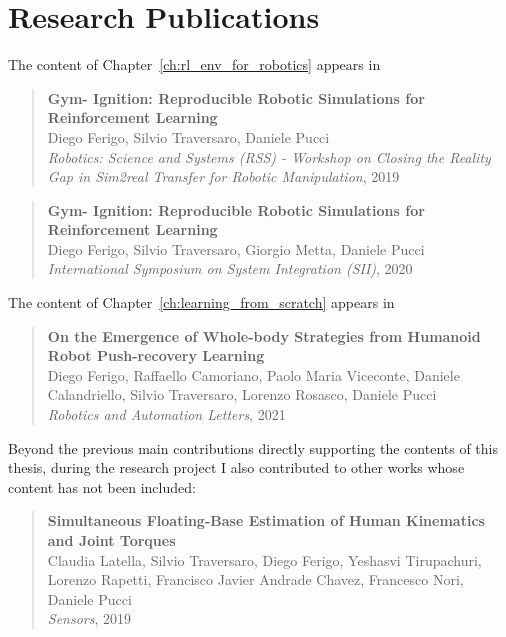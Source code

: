 \section*{Research Publications}

The content of Chapter~\ref{ch:rl_env_for_robotics} appears in

\begin{quote}
    \textbf{Gym-
Ignition: Reproducible Robotic Simulations for Reinforcement
Learning} \\
    Diego Ferigo, Silvio Traversaro, Daniele Pucci \\
    \textit{Robotics: Science and Systems (RSS) - Workshop on
Closing the Reality Gap in Sim2real Transfer for Robotic Manipulation}, 2019
\end{quote}

\begin{quote}
    \textbf{Gym-
Ignition: Reproducible Robotic Simulations for Reinforcement
Learning} \\
    Diego Ferigo, Silvio Traversaro, Giorgio Metta, Daniele Pucci \\
    \textit{International Symposium on System Integration (SII)}, 2020
\end{quote}

\noindent
The content of Chapter~\ref{ch:learning_from_scratch} appears in

\begin{quote}
    \textbf{On the Emergence of Whole-body Strategies from
Humanoid Robot Push-recovery Learning} \\
    Diego Ferigo, Raffaello Camoriano, Paolo Maria Viceconte, Daniele Calandriello, Silvio Traversaro, Lorenzo Rosasco, Daniele Pucci \\
    \textit{Robotics and Automation Letters}, 2021
\end{quote}

\noindent
Beyond the previous main contributions directly supporting the contents of this thesis, during the research project I also contributed to other works whose content has not been included:

\begin{quote}
    \textbf{Simultaneous Floating-Base Estimation of Human Kinematics and Joint Torques} \\
     Claudia Latella, Silvio Traversaro, Diego Ferigo, Yeshasvi Tirupachuri, Lorenzo Rapetti, Francisco Javier Andrade Chavez, Francesco Nori, Daniele Pucci \\
    \textit{Sensors}, 2019
\end{quote}

